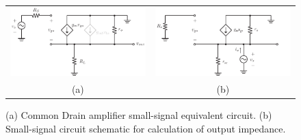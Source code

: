 \begin{figure}[tb]
\begin{center}
\begin{tabular}{cc}
\includegraphics[scale=.75]{cd_amp_ss_av2} &
\includegraphics[scale=.75]{cd_amp_ss_rout} \\
(a) & (b) \\
\end{tabular}
\end{center}
\caption{(a) Common Drain amplifier small-signal equivalent circuit.  (b)  Small-signal circuit schematic for calculation of output impedance.} \label{fig:cd_amp_ss_av2}
\end{figure}

